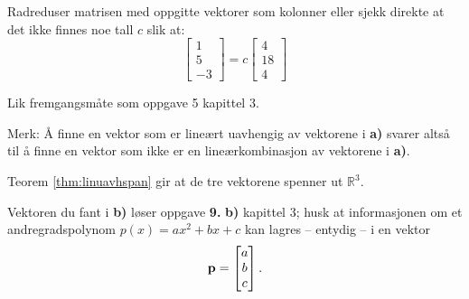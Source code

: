 \begin{losning}

\begin{punkt}
Radreduser matrisen med oppgitte vektorer som kolonner eller sjekk
direkte at det ikke finnes noe tall $c$ slik at:
\[
\begin{bmatrix}
1\\
5\\
-3
\end{bmatrix}=c\begin{bmatrix}
4\\
18\\
4
\end{bmatrix}
\]
\end{punkt}

\begin{punkt}
Lik fremgangsmåte som oppgave 5 kapittel 3.

\noindent
Merk: Å finne en vektor som er lineært uavhengig av vektorene i \textbf{a)} svarer altså til å finne en vektor som ikke er en lineærkombinasjon av vektorene i \textbf{a)}. 
\end{punkt}

\begin{punkt}
Teorem \ref{thm:linuavhspan} gir at de tre vektorene spenner ut $\mathbb{R}^3$.

Vektoren du fant i \textbf{b)} løser oppgave \textbf{9.} \textbf{b)} kapittel 3; husk at informasjonen om et andregradspolynom $p(x)=ax^2+bx+c$ kan lagres -- entydig -- i en vektor $$\mathbf{p}=\begin{bmatrix}
a\\
b\\
c
\end{bmatrix}.$$
\end{punkt}

\end{losning}






